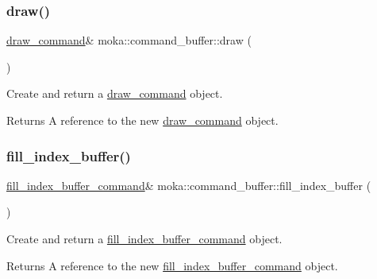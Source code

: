 \subsubsection{\texorpdfstring{draw()}{draw()}}
{\footnotesize\ttfamily \mbox{\hyperlink{classmoka_1_1draw__command}{draw\+\_\+command}}\& moka\+::command\+\_\+buffer\+::draw (\begin{DoxyParamCaption}{ }\end{DoxyParamCaption})}



Create and return a \mbox{\hyperlink{classmoka_1_1draw__command}{draw\+\_\+command}} object. 

\begin{DoxyReturn}{Returns}
A reference to the new \mbox{\hyperlink{classmoka_1_1draw__command}{draw\+\_\+command}} object. 
\end{DoxyReturn}
\mbox{\label{classmoka_1_1command__buffer_a0fe7a69cf32991748f49ce3d9d962c8d}} 
\subsubsection{\texorpdfstring{fill\_index\_buffer()}{fill\_index\_buffer()}}
{\footnotesize\ttfamily \mbox{\hyperlink{classmoka_1_1fill__index__buffer__command}{fill\+\_\+index\+\_\+buffer\+\_\+command}}\& moka\+::command\+\_\+buffer\+::fill\+\_\+index\+\_\+buffer (\begin{DoxyParamCaption}{ }\end{DoxyParamCaption})}



Create and return a \mbox{\hyperlink{classmoka_1_1fill__index__buffer__command}{fill\+\_\+index\+\_\+buffer\+\_\+command}} object. 

\begin{DoxyReturn}{Returns}
A reference to the new \mbox{\hyperlink{classmoka_1_1fill__index__buffer__command}{fill\+\_\+index\+\_\+buffer\+\_\+command}} object. 
\end{DoxyReturn}
\mbox{\label{classmoka_1_1command__buffer_ac392f93e0677fd637ea243d82c06c64d}} 
